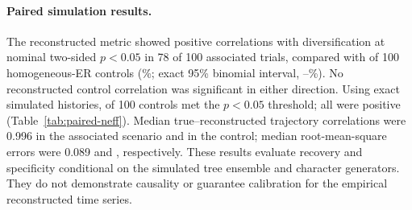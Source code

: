 \paragraph{Paired simulation results.}
The reconstructed metric showed positive correlations with diversification
at nominal two-sided $p<0.05$ in 78 of 100 associated trials, compared with
\NullPositive{} of 100 homogeneous-ER controls
(\NullPositive{}\%; exact 95\% binomial interval,
\NullPositiveLower{}--\NullPositiveUpper{}\%).
No reconstructed control correlation was significant in either direction.
Using exact simulated histories, \NullTruthAny{} of 100 controls met the
$p<0.05$ threshold; all were positive (Table~\ref{tab:paired-neff}).
Median true--reconstructed trajectory correlations were 0.996 in the
associated scenario and \NullRecoveryR{} in the control; median
root-mean-square errors were 0.089 and \NullRecoveryRMSE{}, respectively.
These results evaluate recovery and specificity conditional on the simulated
tree ensemble and character generators. They do not demonstrate causality
or guarantee calibration for the empirical reconstructed time series.
